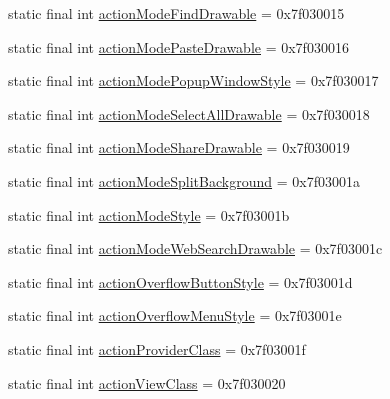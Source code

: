 \begin{DoxyCompactItemize}
static final int \mbox{\hyperlink{classandroid_1_1support_1_1v7_1_1appcompat_1_1_r_1_1attr_a386de696bceb17018e1a23752a1cca0a}{action\+Mode\+Find\+Drawable}} = 0x7f030015
\item 
static final int \mbox{\hyperlink{classandroid_1_1support_1_1v7_1_1appcompat_1_1_r_1_1attr_a7f7e6ffd10b94048d2aac78d14337331}{action\+Mode\+Paste\+Drawable}} = 0x7f030016
\item 
static final int \mbox{\hyperlink{classandroid_1_1support_1_1v7_1_1appcompat_1_1_r_1_1attr_a9873917b9626a17f0f530aa4ee6ae0ab}{action\+Mode\+Popup\+Window\+Style}} = 0x7f030017
\item 
static final int \mbox{\hyperlink{classandroid_1_1support_1_1v7_1_1appcompat_1_1_r_1_1attr_a643128ee6e0b39ab3a490d97a1bc2a1c}{action\+Mode\+Select\+All\+Drawable}} = 0x7f030018
\item 
static final int \mbox{\hyperlink{classandroid_1_1support_1_1v7_1_1appcompat_1_1_r_1_1attr_a7f11cb5e5203407d71e651d923016ad3}{action\+Mode\+Share\+Drawable}} = 0x7f030019
\item 
static final int \mbox{\hyperlink{classandroid_1_1support_1_1v7_1_1appcompat_1_1_r_1_1attr_a27e89a35d4e5b7a4522b59727f808ebb}{action\+Mode\+Split\+Background}} = 0x7f03001a
\item 
static final int \mbox{\hyperlink{classandroid_1_1support_1_1v7_1_1appcompat_1_1_r_1_1attr_a1c138e650476ea7b80b937442308cb87}{action\+Mode\+Style}} = 0x7f03001b
\item 
static final int \mbox{\hyperlink{classandroid_1_1support_1_1v7_1_1appcompat_1_1_r_1_1attr_a1bb0233f9691195dcca82e520fc9ab83}{action\+Mode\+Web\+Search\+Drawable}} = 0x7f03001c
\item 
static final int \mbox{\hyperlink{classandroid_1_1support_1_1v7_1_1appcompat_1_1_r_1_1attr_ac44246b93fdaca5edd18dab65f8b7093}{action\+Overflow\+Button\+Style}} = 0x7f03001d
\item 
static final int \mbox{\hyperlink{classandroid_1_1support_1_1v7_1_1appcompat_1_1_r_1_1attr_a4c4788cbdd5264d93ada23fbcda01b19}{action\+Overflow\+Menu\+Style}} = 0x7f03001e
\item 
static final int \mbox{\hyperlink{classandroid_1_1support_1_1v7_1_1appcompat_1_1_r_1_1attr_ae5669dfd36f25313a003316d285651fa}{action\+Provider\+Class}} = 0x7f03001f
\item 
static final int \mbox{\hyperlink{classandroid_1_1support_1_1v7_1_1appcompat_1_1_r_1_1attr_abfb8c0fa2a1c70398a977c91f3e8792d}{action\+View\+Class}} = 0x7f030020
\item 

\end{DoxyCompactItemize}
